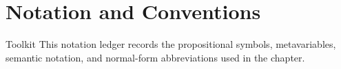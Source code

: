 \section{Notation and Conventions}

\begin{toolkitbox}{Toolkit}
This notation ledger records the propositional symbols, metavariables,
semantic notation, and normal-form abbreviations used in the chapter.
\end{toolkitbox}




